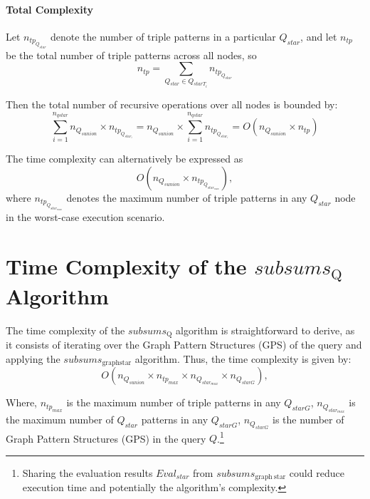 \paragraph{Total Complexity}
Let $n_{tp_{Q_{star}}}$ denote the number of triple patterns in a particular $Q_{star}$, and let $n_{tp}$ be the total number of triple patterns across all nodes, so
$$
n_{tp} = \sum_{Q_{star} \in Q_{starT_i}} n_{tp_{Q_{star}}}
$$

Then the total number of recursive operations over all nodes is bounded by:
$$
\sum_{i=1}^{n_{qstar}} n_{Q_{sunion}} \times n_{tp_{Q_{star_i}}} = n_{Q_{sunion}} \times \sum_{i=1}^{n_{qstar}} n_{tp_{Q_{star_i}}} = O(n_{Q_{sunion}} \times n_{tp})
$$

The time complexity can alternatively be expressed as
\begin{equation}
O(n_{Q_{sunion}} \times n_{tp_{Q_{star_{max}}}}),
\end{equation}
where $n_{tp_{Q_{star_{max}}}}$ denotes the maximum number of triple patterns in any $Q_{star}$ node in the worst-case execution scenario.

\section{Time Complexity of the $subsums_{\mathrm{Q}}$ Algorithm}



The time complexity of the $subsums_{\mathrm{Q}}$ algorithm is straightforward to derive, as it consists of iterating over the Graph Pattern Structures (GPS) of the query and applying the $subsums_{\mathrm{graph star}}$ algorithm. Thus, the time complexity is given by:
\begin{equation}
O(n_{Q_{sunion}} \times n_{tp_{max}} \times n_{Q_{star_{max}}} \times n_{Q_{starG}}),
\end{equation}

Where, $n_{tp_{max}}$ is the maximum number of triple patterns in any $Q_{starG}$,
$n_{Q_{star_{max}}}$ is the maximum number of $Q_{star}$ patterns in any $Q_{starG}$,
$n_{Q_{starG}}$ is the number of Graph Pattern Structures (GPS) in the query $Q$.\footnote{
    Sharing the evaluation results $Eval_{star}$ from $subsums_{\mathrm{graph\ star}}$ could reduce execution time and potentially the algorithm's complexity.
}
